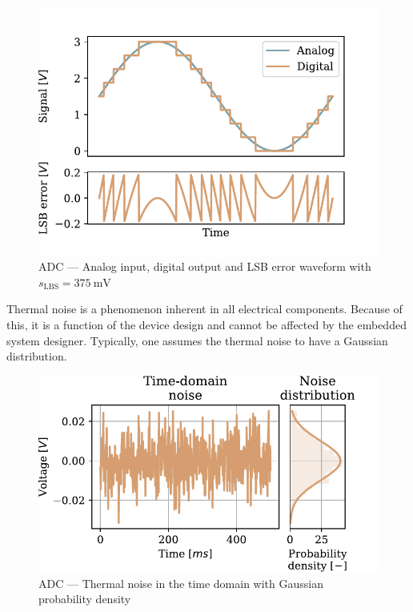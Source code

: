 \begin{figure}[!htb]
  \centering
  \includegraphics[scale=0.72]{figures/electronics/adc/plot_lsberr}
  \caption[ADC LSB waveform]{\ac{ADC} --- Analog input, digital output and \ac{LSB} error waveform with $s_\text{LBS} = \SI{375}{\milli\volt}$\cite{hall2020fund}%
    \label{fig:plot_lsberr}}
\end{figure}

Thermal noise is a phenomenon inherent in all electrical components. Because of this, it is a function of the device design and cannot be affected by the embedded system designer. Typically, one assumes the thermal noise to have a Gaussian distribution.

\begin{figure}
  \centering
  \includegraphics[scale=0.72]{figures/electronics/adc/plot_thermerr}
  \caption[ADC thermal noise]{ADC --- Thermal noise in the time domain with Gaussian probability density~\cite{hall2020fund}%
    \label{fig:plot_themerr}}
\end{figure}
